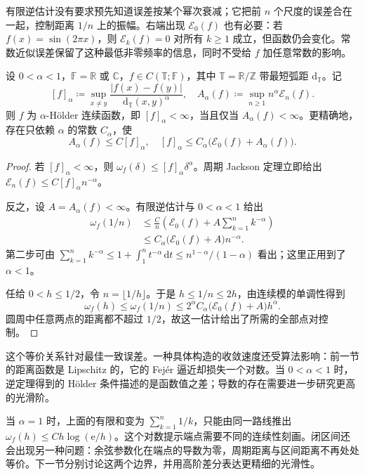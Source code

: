 有限逆估计没有要求预先知道误差按某个幂次衰减；它把前 \(n\) 个尺度的误差合在一起，控制距离 \(1/n\) 上的振幅。右端出现 \(\mathcal E_0(f)\) 也有必要：若 \(f(x)=\sin(2\pi x)\)，则 \(\mathcal E_k(f)=0\) 对所有 \(k\geq1\) 成立，但函数仍会变化。常数近似误差保留了这种最低非零频率的信息，同时不受给 \(f\) 加任意常数的影响。

\begin{corollary}
\label{b2:cor:approximation-holder-characterization}
设 \(0<\alpha<1\)，\(\mathbb F=\mathbb R\) 或 \(\mathbb C\)，\(f\in C(\mathbb T;\mathbb F)\)，其中 \(\mathbb T=\mathbb R/\mathbb Z\) 带最短弧距 \(\mathrm d_{\mathbb T}\)。记
\[
 [f]_\alpha\coloneqq
  \sup_{x\neq y}\frac{|f(x)-f(y)|}{\mathrm d_{\mathbb T}(x,y)^\alpha},
 \quad
 A_\alpha(f)\coloneqq\sup_{n\geq1}n^\alpha\mathcal E_n(f).
\]
则 \(f\) 为 \(\alpha\)-Hölder 连续函数，即 \([f]_\alpha<\infty\)，当且仅当 \(A_\alpha(f)<\infty\)。更精确地，存在只依赖 \(\alpha\) 的常数 \(C_\alpha\)，使
\[
 A_\alpha(f)\leq C[f]_\alpha,
 \quad
 [f]_\alpha\leq C_\alpha\bigl(\mathcal E_0(f)+A_\alpha(f)\bigr).
\]
\end{corollary}
\begin{proof}
若 \([f]_\alpha<\infty\)，则 \(\omega_f(\delta)\leq[f]_\alpha\delta^\alpha\)。周期 Jackson 定理立即给出 \(\mathcal E_n(f)\leq C[f]_\alpha n^{-\alpha}\)。

反之，设 \(A=A_\alpha(f)<\infty\)。有限逆估计与 \(0<\alpha<1\) 给出
\[
 \begin{aligned}
 \omega_f(1/n)
 &\leq\frac Cn\left(\mathcal E_0(f)+A\sum_{k=1}^nk^{-\alpha}\right)\\
 &\leq C_\alpha\bigl(\mathcal E_0(f)+A\bigr)n^{-\alpha}.
 \end{aligned}
\]
第二步可由 \(\sum_{k=1}^nk^{-\alpha}\leq1+\int_1^nt^{-\alpha}\,\mathrm dt\leq n^{1-\alpha}/(1-\alpha)\) 看出；这里正用到了 \(\alpha<1\)。

任给 \(0<h\leq1/2\)，令 \(n=\lfloor1/h\rfloor\)。于是 \(h\leq1/n\leq2h\)，由连续模的单调性得到
\[
 \omega_f(h)\leq\omega_f(1/n)
 \leq 2^\alpha C_\alpha\bigl(\mathcal E_0(f)+A\bigr)h^\alpha.
\]
圆周中任意两点的距离都不超过 \(1/2\)，故这一估计给出了所需的全部点对控制。
\end{proof}

这个等价关系针对最佳一致误差。一种具体构造的收敛速度还受算法影响：前一节的距离函数是 Lipschitz 的，它的 Fejér 逼近却损失一个对数。当 \(0<\alpha<1\) 时，逆定理得到的 Hölder 条件描述的是函数值之差；导数的存在需要进一步研究更高的光滑阶。

\ProseParagraphBreak

当 \(\alpha=1\) 时，上面的有限和变为 \(\sum_{k=1}^n1/k\)，只能由同一路线推出 \(\omega_f(h)\leq Ch\log(\mathrm e/h)\)。这个对数提示端点需要不同的连续性刻画。闭区间还会出现另一种问题：余弦参数化在端点的导数为零，周期距离与区间距离不再处处等价。下一节分别讨论这两个边界，并用高阶差分表达更精细的光滑性。
